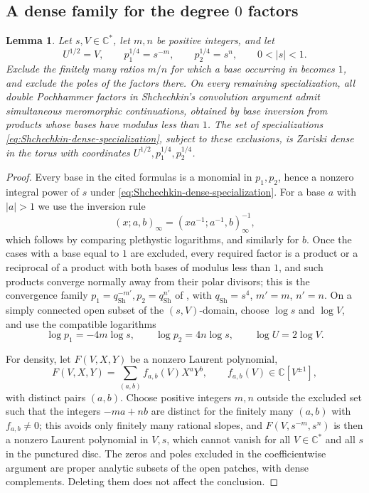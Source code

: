 \documentclass{amsart}
\newtheorem{lemma}{Lemma}
\theoremstyle{definition}
\numberwithin{equation}{section}
\newcommand{\C}{\mathbb C}
\begin{document}
\subsection{A dense family for the degree \(0\) factors}
\begin{lemma}
\label{lem:Shchechkin-dense-domain}
Let \(s,V\in\C^*\), let \(m,n\) be positive integers, and let
\begin{equation}
 U^{1/2}=V,\qquad
 p_1^{1/4}=s^{-m},\qquad p_2^{1/4}=s^n,
 \qquad 0<\lvert s\rvert<1.
\label{eq:Shchechkin-dense-specialization}
\end{equation}
Exclude the finitely many ratios \(m/n\) for which a base occurring in \cite[equations~(3.2)--(3.27)]{Shchechkin} becomes \(1\), and exclude the poles of the factors there.  On every remaining specialization, all double Pochhammer factors in Shchechkin's convolution argument admit simultaneous meromorphic continuations, obtained by base inversion from products whose bases have modulus less than \(1\).  The set of specializations \eqref{eq:Shchechkin-dense-specialization}, subject to these exclusions, is Zariski dense in the torus with coordinates \(U^{1/2},p_1^{1/4},p_2^{1/4}\).
\end{lemma}

\begin{proof}
Every base in the cited formulas is a monomial in \(p_1,p_2\), hence a nonzero integral power of \(s\) under \eqref{eq:Shchechkin-dense-specialization}.  For a base \(a\) with \(\lvert a\rvert>1\) we use the inversion rule
\begin{equation}
 (x;a,b)_\infty
 =\left(xa^{-1};a^{-1},b\right)_\infty^{-1},
\label{eq:double-Pochhammer-base-inversion}
\end{equation}
which follows by comparing plethystic logarithms, and similarly for \(b\).  Once the cases with a base equal to \(1\) are excluded, every required factor is a product or a reciprocal of a product with both bases of modulus less than \(1\), and such products converge normally away from their polar divisors; this is the convergence family \(p_1=q_{\mathrm{Sh}}^{-m'},p_2=q_{\mathrm{Sh}}^{n'}\) of \cite[Section~2.1 and footnote~2]{Shchechkin}, with \(q_{\mathrm{Sh}}=s^4\), \(m'=m\), \(n'=n\).  On a simply connected open subset of the \((s,V)\)-domain, choose \(\log s\) and \(\log V\), and use the compatible logarithms
\[
 \log p_1=-4m\log s,\qquad
 \log p_2=4n\log s,\qquad
 \log U=2\log V.
\]

For density, let \(F(V,X,Y)\) be a nonzero Laurent polynomial,
\[
 F(V,X,Y)=\sum_{(a,b)}f_{a,b}(V)X^aY^b,
 \qquad f_{a,b}(V)\in\C[V^{\pm1}],
\]
with distinct pairs \((a,b)\).  Choose positive integers \(m,n\) outside the excluded set such that the integers \(-ma+nb\) are distinct for the finitely many \((a,b)\) with \(f_{a,b}\neq0\); this avoids only finitely many rational slopes, and \(F(V,s^{-m},s^n)\) is then a nonzero Laurent polynomial in \(V,s\), which cannot vanish for all \(V\in\C^*\) and all \(s\) in the punctured disc.  The zeros and poles excluded in the coefficientwise argument are proper analytic subsets of the open patches, with dense complements.  Deleting them does not affect the conclusion.
\end{proof}
\end{document}
